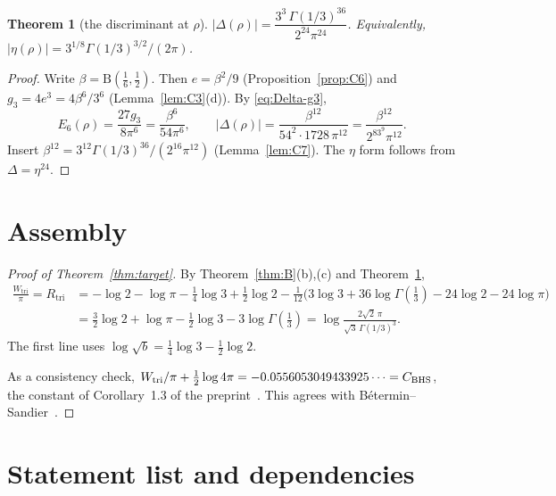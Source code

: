 \documentclass[11pt]{article}
\newtheorem{theorem}{Theorem}[section]
\theoremstyle{definition}
\theoremstyle{remark}
\begin{document}
\begin{theorem}[the discriminant at $\rho$]\label{thm:C}
$|\Delta(\rho)|=\dfrac{3^3\,\Gamma(1/3)^{36}}{2^{24}\pi^{24}}$. Equivalently,
$|\eta(\rho)|=3^{1/8}\Gamma(1/3)^{3/2}/(2\pi)$.
\end{theorem}

\begin{proof}
Write $\beta=\mathrm B(\tfrac16,\tfrac12)$. Then $e=\beta^2/9$ (Proposition~\ref{prop:C6}) and
$g_3=4e^3=4\beta^6/3^6$ (Lemma~\ref{lem:C3}(d)). By \eqref{eq:Delta-g3},
\[
 E_6(\rho)=\frac{27g_3}{8\pi^6}=\frac{\beta^6}{54\pi^6},\qquad
 |\Delta(\rho)|=\frac{\beta^{12}}{54^2\cdot1728\,\pi^{12}}=\frac{\beta^{12}}{2^83^9\pi^{12}} .
\]
Insert $\beta^{12}=3^{12}\Gamma(1/3)^{36}/(2^{16}\pi^{12})$ (Lemma~\ref{lem:C7}). The $\eta$ form follows from
$\Delta=\eta^{24}$.
\end{proof}

\section{Assembly}\label{sec:assembly}

\begin{proof}[Proof of Theorem~\ref{thm:target}]
By Theorem~\ref{thm:B}(b),(c) and Theorem~\ref{thm:C},
\begin{align*}
 \frac{W_{\mathrm{tri}}}{\pi}=R_{\mathrm{tri}}
 &=-\log2-\log\pi-\tfrac14\log3+\tfrac12\log2-\tfrac1{12}\bigl(3\log3+36\log\Gamma(\tfrac13)-24\log2-24\log\pi\bigr)\\
 &=\tfrac32\log2+\log\pi-\tfrac12\log3-3\log\Gamma(\tfrac13)
 =\log\frac{2\sqrt2\,\pi}{\sqrt3\,\Gamma(1/3)^3}.
\end{align*}
The first line uses $\log\sqrt b=\tfrac14\log3-\tfrac12\log2$.

As a consistency check, $W_{\mathrm{tri}}/\pi+\tfrac12\log4\pi=-0.0556053049433925\dots=C_{\rm BHS}$, the constant of
Corollary~1.3 of the preprint~\cite{Preprint}.
This agrees with B\'etermin--Sandier~\cite[\S7.3]{BeterminSandier2018}.
\end{proof}

\section{Statement list and dependencies}
\end{document}
